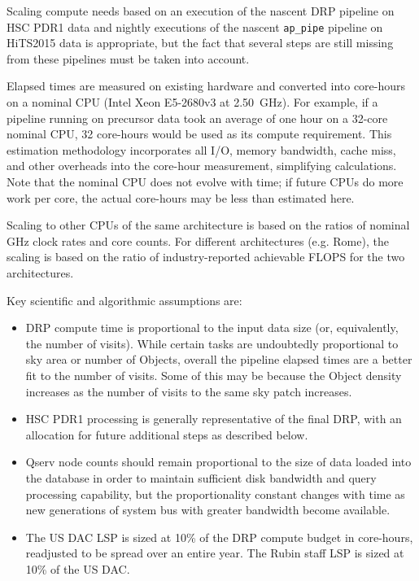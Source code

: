 Scaling compute needs based on an execution of the nascent DRP pipeline on HSC PDR1 data and nightly executions of the nascent \texttt{ap\_pipe} pipeline on HiTS2015 data is appropriate, but the fact that several steps are still missing from these pipelines must be taken into account.

Elapsed times are measured on existing hardware and converted into core-hours on a nominal CPU (Intel Xeon E5-2680v3 at 2.50~GHz).
For example, if a pipeline running on precursor data took an average of one hour on a 32-core nominal CPU, 32 core-hours would be used as its compute requirement.
This estimation methodology incorporates all I/O, memory bandwidth, cache miss, and other overheads into the core-hour measurement, simplifying calculations.
Note that the nominal CPU does not evolve with time; if future CPUs do more work per core, the actual core-hours may be less than estimated here.

Scaling to other CPUs of the same architecture is based on the ratios of nominal GHz clock rates and core counts.
For different architectures (e.g. Rome), the scaling is based on the ratio of industry-reported achievable FLOPS for the two architectures.

Key scientific and algorithmic assumptions are:
\begin{itemize}
\item DRP compute time is proportional to the input data size (or, equivalently, the number of visits).
While certain tasks are undoubtedly proportional to sky area or number of Objects, overall the pipeline elapsed times are a better fit to the number of visits.
Some of this may be because the Object density increases as the number of visits to the same sky patch increases.
\item HSC PDR1 processing is generally representative of the final DRP, with an allocation for future additional steps as described below.
\item Qserv node counts should remain proportional to the size of data loaded into the database in order to maintain sufficient disk bandwidth and query processing capability, but the proportionality constant changes with time as new generations of system bus with greater bandwidth become available.
\item The US DAC LSP is sized at 10\% of the DRP compute budget in core-hours, readjusted to be spread over an entire year.
The Rubin staff LSP is sized at 10\% of the US DAC.

\end{itemize}

